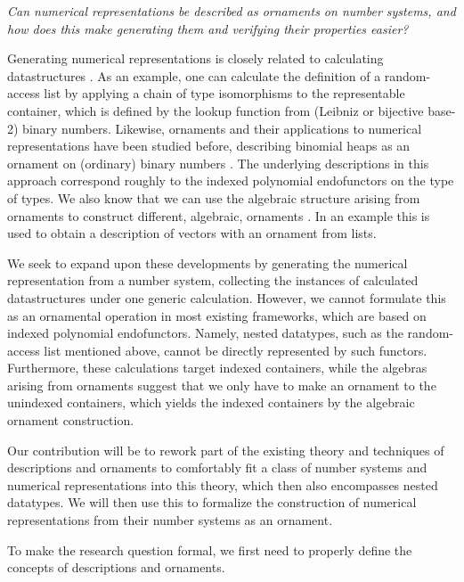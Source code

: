 \textit{Can numerical representations be described as ornaments on number systems, and how does this make generating them and verifying their properties easier?}

Generating numerical representations is closely related to calculating datastructures \cite{calcdata}. As an example, one can calculate the definition of a random-access list by applying a chain of type isomorphisms to the representable container, which is defined by the lookup function from (Leibniz or bijective base-2) binary numbers. Likewise, ornaments and their applications to numerical representations have been studied before, describing binomial heaps as an ornament on (ordinary) binary numbers \cite{progorn}. The underlying descriptions in this approach correspond roughly to the indexed polynomial endofunctors on the type of types. We also know that we can use the algebraic structure arising from ornaments to construct different, algebraic, ornaments \cite{algorn}. In an example this is used to obtain a description of vectors with an ornament from lists.

We seek to expand upon these developments by generating the numerical representation from a number system, collecting the instances of calculated datastructures under one generic calculation. However, we cannot formulate this as an ornamental operation in most existing frameworks, which are based on indexed polynomial endofunctors. Namely, nested datatypes, such as the random-access list mentioned above, cannot be directly represented by such functors. Furthermore, these calculations target indexed containers, while the algebras arising from ornaments suggest that we only have to make an ornament to the unindexed containers, which yields the indexed containers by the algebraic ornament construction.

Our contribution will be to rework part of the existing theory and techniques of descriptions and ornaments to comfortably fit a class of number systems and numerical representations into this theory, which then also encompasses nested datatypes. We will then use this to formalize the construction of numerical representations from their number systems as an ornament.

To make the research question formal, we first need to properly define the concepts of descriptions and ornaments.

